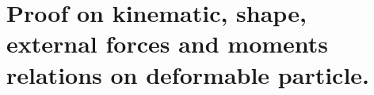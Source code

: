 \chapter{Proof on kinematic, shape, external forces and moments relations on deformable particle.}
\label{ap:cinematic}


